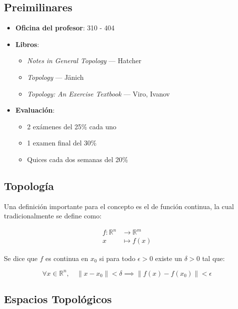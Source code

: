 \subsection{Preimilinares}

\begin{itemize}
    \item \textbf{Oficina del profesor}: 310 - 404
    \item \textbf{Libros}:
    \begin{itemize}
        \item \textit{Notes in General Topology} --- Hatcher
        \item \textit{Topology} --- Jänich
        \item \textit{Topology: An Exercise Textbook} --- Viro, Ivanov
    \end{itemize}
    \item \textbf{Evaluación}:
    \begin{itemize}
        \item 2 exámenes del 25\% cada uno
        \item 1 examen final del 30\%
        \item Quices cada dos semanas del 20\%
    \end{itemize}
\end{itemize}

\subsection{Topología}

Una definición importante para el concepto es el de función continua, la cual tradicionalmente se define como:

\[
\begin{aligned}
f: \mathbb{R}^n &\longrightarrow \mathbb{R}^m \\
x &\longmapsto f(x)
\end{aligned}
\]

Se dice que $f$ es continua en $x_0$ si para todo $\epsilon > 0$ existe un $\delta > 0$ tal que:

\[
\forall x \in \mathbb{R}^n, \quad \|x - x_0\| < \delta \implies \|f(x) - f(x_0)\| < \epsilon
\]

\subsection{Espacios Topológicos}

